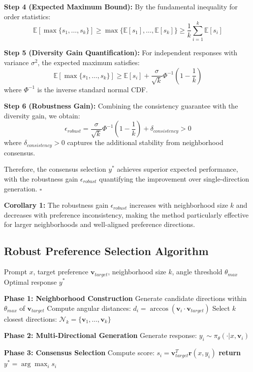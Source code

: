 \documentclass{article} %
\begin{document}
\textbf{Step 4 (Expected Maximum Bound):} By the fundamental inequality for order statistics:
\begin{equation}
\mathbb{E}[\max\{s_1, \ldots, s_k\}] \geq \max\{\mathbb{E}[s_1], \ldots, \mathbb{E}[s_k]\} \geq \frac{1}{k}\sum_{i=1}^k \mathbb{E}[s_i]
\end{equation}

\textbf{Step 5 (Diversity Gain Quantification):} For independent responses with variance $\sigma^2$, the expected maximum satisfies:
\begin{equation}
\mathbb{E}[\max\{s_1, \ldots, s_k\}] \geq \mathbb{E}[s_i] + \frac{\sigma}{\sqrt{k}} \Phi^{-1}\left(1-\frac{1}{k}\right)
\end{equation}
where $\Phi^{-1}$ is the inverse standard normal CDF.

\textbf{Step 6 (Robustness Gain):} Combining the consistency guarantee with the diversity gain, we obtain:
\begin{equation}
\epsilon_{robust} = \frac{\sigma}{\sqrt{k}} \Phi^{-1}\left(1-\frac{1}{k}\right) + \delta_{consistency} > 0
\end{equation}
where $\delta_{consistency} > 0$ captures the additional stability from neighborhood consensus.

Therefore, the consensus selection $y^*$ achieves superior expected performance, with the robustness gain $\epsilon_{robust}$ quantifying the improvement over single-direction generation. $\square$

\textbf{Corollary 1:} The robustness gain $\epsilon_{robust}$ increases with neighborhood size $k$ and decreases with preference inconsistency, making the method particularly effective for larger neighborhoods and well-aligned preference directions.

\subsection{Robust Preference Selection Algorithm}

\begin{algorithm}[H]
\caption{Robust Preference Selection (RPS)}
\begin{algorithmic}[1]
\REQUIRE Prompt $x$, target preference $\mathbf{v}_{target}$, neighborhood size $k$, angle threshold $\theta_{max}$
\ENSURE Optimal response $y^*$

\STATE \textbf{Phase 1: Neighborhood Construction}
\STATE Generate candidate directions within $\theta_{max}$ of $\mathbf{v}_{target}$
\STATE Compute angular distances: $d_i = \arccos(\mathbf{v}_i \cdot \mathbf{v}_{target})$
\STATE Select $k$ closest directions: $\mathcal{N}_k = \{\mathbf{v}_1, \ldots, \mathbf{v}_k\}$

\STATE \textbf{Phase 2: Multi-Directional Generation}
    \STATE Generate response: $y_i \sim \pi_\theta(\cdot|x, \mathbf{v}_i)$
\ENDFOR

\STATE \textbf{Phase 3: Consensus Selection}
    \STATE Compute score: $s_i = \mathbf{v}_{target}^T \mathbf{r}(x, y_i)$
\ENDFOR
\STATE \textbf{return} $y^* = \arg\max_i s_i$
\end{algorithmic}
\end{algorithm}
\end{document}
